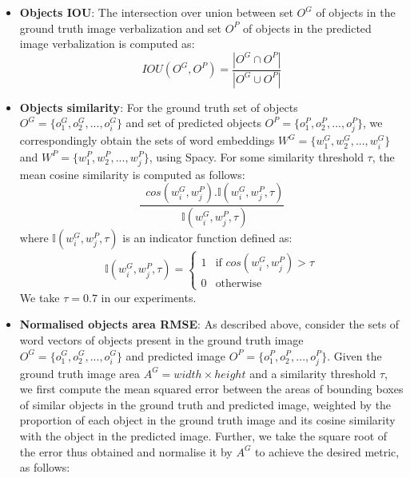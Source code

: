 \begin{itemize}
    \item \textbf{Objects IOU}: The intersection over union between set $O^G$ of objects in the ground truth image verbalization and set $O^P$ of objects in the predicted image verbalization is computed as:
    \begin{equation}
        IOU(O^G, O^P) = \frac{|O^G \cap O^P|}{|O^G \cup O^P|}
    \end{equation}
    
    \item \textbf{Objects similarity}: For the ground truth set of objects $O^G = \{o_1^G, o_2^G, ..., o_i^G\}$ and set of predicted objects $O^P = \{o_1^P, o_2^P, ..., o_j^P\}$, we correspondingly obtain the sets of word embeddings $W^G = \{w_1^G, w_2^G, ..., w_i^G\}$ and $W^P = \{w_1^P, w_2^P, ..., w_j^P\}$, using Spacy. For some similarity threshold $\tau$, the mean cosine similarity is computed as follows:
    \begin{equation}
        \frac{\mathop{\sum_{i=1}^{|O^G|}\sum_{j=1}^{|O^P|}} cos(w_i^G, w_j^P).\mathbb{I}(w_i^G, w_j^P, \tau)}{\mathop{\sum_{i=1}^{|O^G|}\sum_{j=1}^{|O^P|}} \mathbb{I}(w_i^G, w_j^P, \tau) }
    \end{equation}
    where $\mathbb{I}(w_i^G, w_j^P, \tau)$ is an indicator function defined as:
    \begin{equation}
        \mathbb{I}(w_i^G, w_j^P, \tau) =
    \begin{cases}
        1 & \text{if } cos(w_i^G, w_j^P) > \tau\\
        0 & \text{otherwise}
    \end{cases}
    \end{equation}
    We take $\tau = 0.7$ in our experiments.
    
    \item \textbf{Normalised objects area RMSE}: As described above, consider the sets of word vectors of objects present in the ground truth image $O^G = \{o_1^G, o_2^G, ..., o_i^G\}$ and predicted image $O^P = \{o_1^P, o_2^P, ..., o_j^P\}$. Given the ground truth image area $ A^G = width \times height$ and a similarity threshold $\tau$, we first compute the mean squared error between the areas of bounding boxes of similar objects in the ground truth and predicted image, weighted by the proportion of each object in the ground truth image and its cosine similarity with the object in the predicted image. Further, we take the square root of the error thus obtained and normalise it by $A^G$ to achieve the desired metric, as follows:


\end{itemize}
